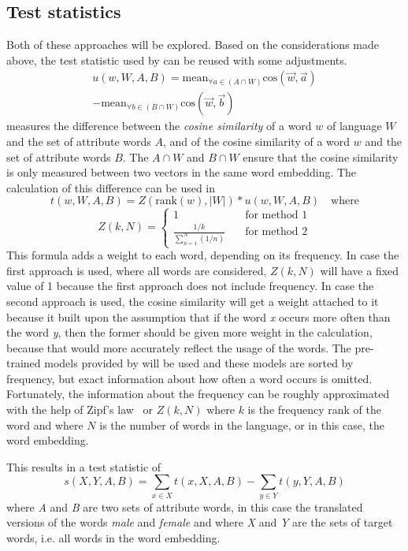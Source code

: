 \subsection{Test statistics}
Both of these approaches will be explored. Based on the considerations made above, the
test statistic used by
\textcite{caliskan_2017_semantics_language_corpora} can be reused with some adjustments. 
$$
\begin{aligned}
u(w,W,A,B) = \text{mean}_{\forall a \in (A \cap W)}\text{cos}(\overrightarrow{w}, \overrightarrow{a}) \\
- \text{mean}_{\forall b \in (B \cap W)}\text{cos}(\overrightarrow{w}, \overrightarrow{b})
\end{aligned}
$$
measures the difference between the \textit{cosine similarity} of a word $w$ of language $W$ and the set of attribute words $A$, and of the cosine similarity of a word $w$ and the
set of attribute words $B$. The $A \cap W$ and $B \cap W$ ensure that the cosine
similarity is only measured between two vectors in the same word embedding. The
calculation of this difference can be used in
$$
t(w,W,A,B) = Z(\text{rank}(w), |W|) * u(w,W,A,B)\quad\text{where}
$$
$$
Z(k,N) =
\begin{cases}
    1 & \quad \text{for method 1} \\
    \frac{1/k}{\displaystyle\sum_{n=1}^{N}(1/n)} & \quad \text{for method 2}
\end{cases}
$$
This formula adds a weight to each word, depending on its frequency.
In case the first approach is used, where all words are considered, $Z(k,N)$ will have a
fixed value of 1 because the first approach does not include frequency.
In case the second approach is used, the cosine similarity will get a weight attached
to it because it built upon the assumption that
if the word \textit{x} occurs more often than the word \textit{y}, then the former should
be given more weight in the calculation, because that would more accurately reflect the
usage of the words. The pre-trained models provided by \textcite{grave2018learning} will be
used and these models are sorted by frequency, but exact information about how often a
word occurs is omitted.
Fortunately, the information about the frequency can be roughly approximated with the
help of Zipf's law~\parencite{Zipf-1935} or $Z(k,N)$ where $k$ is the frequency rank of the
word and where $N$ is the number of words in the language, or in this case, the word
embedding.

This results in a test statistic of
$$
s(X,Y,A,B) = \displaystyle\sum_{x \in X}t(x,X,A,B) - \displaystyle\sum_{y \in Y}t(y,Y,A,B)
$$
where \textit{A} and \textit{B} are two sets of attribute words, in this case the
translated versions of the words \textit{male} and
\textit{female} and where \textit{X} and \textit{Y} are the sets of target words, i.e.
all words in the word embedding.

